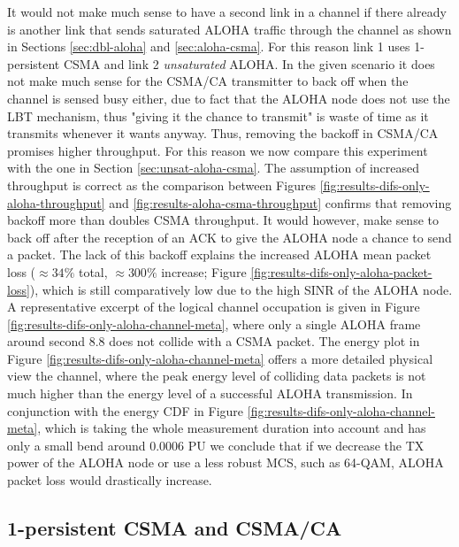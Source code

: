 It would not make much sense to have a second link in a channel if there already is another link that sends saturated ALOHA traffic through the channel as shown in Sections \ref{sec:dbl-aloha} and \ref{sec:aloha-csma}. For this reason link 1 uses 1-persistent CSMA and link 2 \emph{unsaturated} ALOHA. In the given scenario it does not make much sense for the CSMA/CA transmitter to back off when the channel is sensed busy either, due to fact that the ALOHA node does not use the LBT mechanism, thus "giving it the chance to transmit" is waste of time as it transmits whenever it wants anyway. Thus, removing the backoff in CSMA/CA promises higher throughput. For this reason we now compare this experiment with the one in Section \ref{sec:unsat-aloha-csma}. The assumption of increased throughput is correct as the comparison between Figures \ref{fig:results-difs-only-aloha-throughput} and \ref{fig:results-aloha-csma-throughput} confirms that removing backoff more than doubles CSMA throughput. It would however, make sense to back off after the reception of an ACK to give the ALOHA node a chance to send a packet. The lack of this backoff explains the increased ALOHA mean packet loss ($\approx 34\%$ total, $\approx 300\%$ increase;  Figure \ref{fig:results-difs-only-aloha-packet-loss}), which is still comparatively low due to the high SINR of the ALOHA node. A representative excerpt of the logical channel occupation is given in Figure \ref{fig:results-difs-only-aloha-channel-meta}, where only a single ALOHA frame around second 8.8 does not collide with a CSMA packet. The energy plot in Figure  \ref{fig:results-difs-only-aloha-channel-meta} offers a more detailed physical view the channel, where the peak energy level of colliding data packets is not much higher than the energy level of a successful ALOHA transmission. In conjunction with the energy CDF in Figure \ref{fig:results-difs-only-aloha-channel-meta}, which is taking the whole measurement duration into account and has only a small bend around 0.0006 PU we conclude that if we decrease the TX power of the ALOHA node or use a less robust MCS, such as 64-QAM, ALOHA packet loss would drastically increase. 

\clearpage

\subsection{1-persistent CSMA and CSMA/CA}

